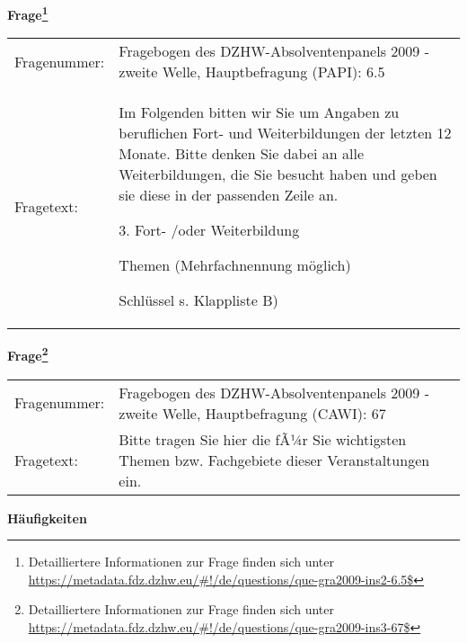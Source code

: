 				\vspace*{0.5cm}
                \noindent\textbf{Frage\footnote{Detailliertere Informationen zur Frage finden sich unter
		              \url{https://metadata.fdz.dzhw.eu/\#!/de/questions/que-gra2009-ins2-6.5$}}}\\
				\begin{tabularx}{\hsize}{@{}lX}
					Fragenummer: &
					  Fragebogen des DZHW-Absolventenpanels 2009 - zweite Welle, Hauptbefragung (PAPI):
					  6.5
 \\
					Fragetext: & Im Folgenden bitten wir Sie um Angaben zu beruflichen Fort- und Weiterbildungen der letzten 12 Monate. Bitte denken Sie dabei an alle Weiterbildungen, die Sie besucht haben und geben sie diese in der passenden Zeile an.\par  3. Fort- /oder Weiterbildung\par  Themen (Mehrfachnennung möglich)\par  Schlüssel s. Klappliste B) \\
				\end{tabularx}
				\vspace*{0.5cm}
                \noindent\textbf{Frage\footnote{Detailliertere Informationen zur Frage finden sich unter
		              \url{https://metadata.fdz.dzhw.eu/\#!/de/questions/que-gra2009-ins3-67$}}}\\
				\begin{tabularx}{\hsize}{@{}lX}
					Fragenummer: &
					  Fragebogen des DZHW-Absolventenpanels 2009 - zweite Welle, Hauptbefragung (CAWI):
					  67
 \\
					Fragetext: & Bitte tragen Sie hier die fÃ¼r Sie wichtigsten Themen bzw. Fachgebiete dieser Veranstaltungen ein. \\
				\end{tabularx}





        		\vspace*{0.5cm}
                \noindent\textbf{Häufigkeiten}

